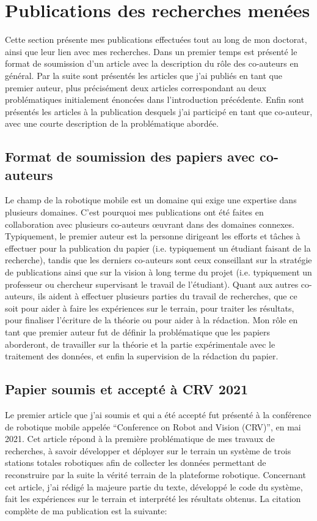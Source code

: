 \section{Publications des recherches menées}
\label{sec:papiers_soumis}

Cette section présente mes publications effectuées tout au long de mon doctorat, ainsi que leur lien avec mes recherches.
Dans un premier temps est présenté le format de soumission d'un article avec la description du rôle des co-auteurs en général. 
Par la suite sont présentés les articles que j'ai publiés en tant que premier auteur, plus précisément deux articles correspondant au deux problématiques initialement énoncées dans l'introduction précédente.
Enfin sont présentés les articles à la publication desquels j'ai participé en tant que co-auteur, avec une courte description de la problématique abordée.

\subsection{Format de soumission des papiers avec co-auteurs}

Le champ de la robotique mobile est un domaine qui exige une expertise dans plusieurs domaines.
C'est pourquoi mes publications ont été faites en collaboration avec plusieurs co-auteurs œuvrant dans des domaines connexes.
Typiquement, le premier auteur est la personne dirigeant les efforts et tâches à effectuer pour la publication du papier (i.e. typiquement un étudiant faisant de la recherche), tandis que les derniers co-auteurs sont ceux conseillant sur la stratégie de publications ainsi que sur la vision à long terme du projet (i.e. typiquement un professeur ou chercheur supervisant le travail de l'étudiant).
Quant aux autres co-auteurs, ils aident à effectuer plusieurs parties du travail de recherches, que ce soit pour aider à faire les expériences sur le terrain, pour traiter les résultats, pour finaliser l'écriture de la théorie ou pour aider à la rédaction.
Mon rôle en tant que premier auteur fut de définir la problématique que les papiers aborderont, de travailler sur la théorie et la partie expérimentale avec le traitement des données, et enfin la supervision de la rédaction du papier.

\subsection{Papier soumis et accepté à CRV 2021}

Le premier article que j'ai soumis et qui a été accepté fut présenté à la conférence de robotique mobile appelée ``Conference on Robot and Vision (CRV)'', en mai 2021.
Cet article répond à la première problématique de mes travaux de recherches, à savoir développer et déployer sur le terrain un système de trois stations totales robotiques afin de collecter les données permettant de reconstruire par la suite la vérité terrain de la plateforme robotique.
Concernant cet article, j'ai rédigé la majeure partie du texte, développé le code du système, fait les expériences sur le terrain et interprété les résultats obtenus.
La citation complète de ma publication est la suivante:

